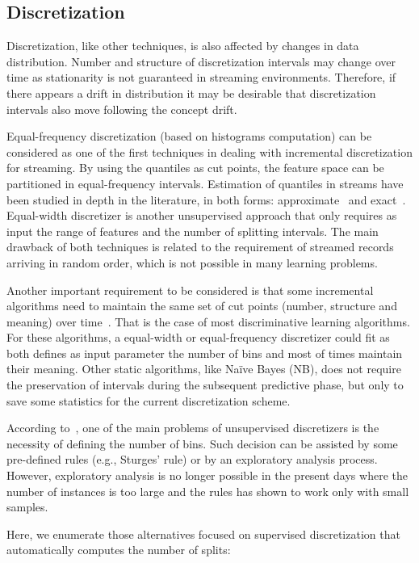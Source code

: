 \documentclass[preprint,12pt]{elsarticle}
\begin{document}
\subsection{Discretization}
\label{subsec:disc}

Discretization, like other techniques, is also affected by changes in data distribution. Number and structure of discretization intervals may change over time as stationarity is not guaranteed in streaming environments. Therefore, if there appears a drift in distribution it  may be desirable that discretization intervals also move following the concept drift.

Equal-frequency discretization (based on histograms computation) can be considered as one of the first techniques in dealing with incremental discretization for streaming. By using the quantiles as cut points, the feature space can be partitioned in equal-frequency intervals. Estimation of quantiles in streams have been studied in depth in the literature, in both forms: approximate~\cite{ben10, webb14} and exact~\cite{gupta03, guha09}. Equal-width discretizer is another unsupervised approach that only requires as input the range of features and the number of splitting intervals. The main drawback of both techniques is related to the requirement of streamed records arriving in random order, which is not possible in many learning problems. 

Another important requirement to be considered is that some incremental algorithms need to maintain the same set of cut points (number, structure and meaning) over time~\cite{webb14}. That is the case of most discriminative learning algorithms. For these algorithms, a equal-width or equal-frequency discretizer could fit as both defines as input parameter the number of bins and most of times maintain their meaning. Other static algorithms, like Na\"ive Bayes (NB), does not require the preservation of intervals during the subsequent predictive phase, but only to save some statistics for the current discretization scheme. 

According to~\cite{gama06}, one of the main problems of unsupervised discretizers is the necessity of defining the number of bins. Such decision can be assisted by some pre-defined rules (e.g., Sturges' rule) or by an exploratory analysis process. However, exploratory analysis is no longer possible in the present days where the number of instances is too large and the rules has shown to work only with small samples.

Here, we enumerate those alternatives focused on supervised discretization that automatically computes the number of splits:
\end{document}
